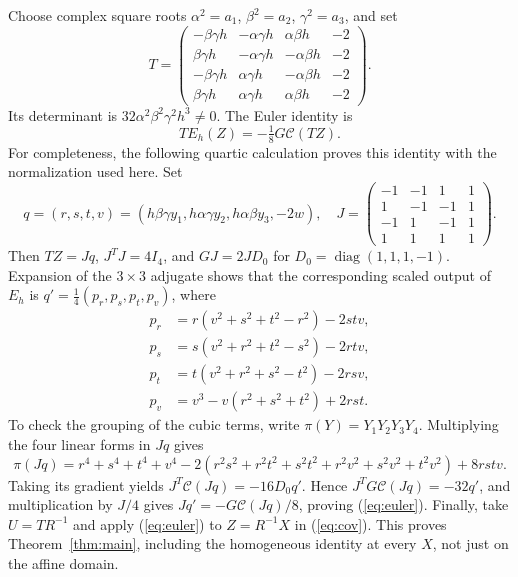 \documentclass[11pt]{article}
\newcommand{\diag}{\operatorname{diag}}
\newcommand{\Cr}{\mathcal C}
\begin{document}
Choose complex square roots $\alpha^2=a_1$, $\beta^2=a_2$, $\gamma^2=a_3$, and set
\begin{equation}\label{eq:T}
 T=\begin{pmatrix}
 -\beta\gamma h&-\alpha\gamma h&\alpha\beta h&-2\\
 \beta\gamma h&-\alpha\gamma h&-\alpha\beta h&-2\\
 -\beta\gamma h&\alpha\gamma h&-\alpha\beta h&-2\\
 \beta\gamma h&\alpha\gamma h&\alpha\beta h&-2
 \end{pmatrix}.
\end{equation}
Its determinant is $32\alpha^2\beta^2\gamma^2h^3\ne0$. The Euler identity is
\begin{equation}\label{eq:euler}
 T E_h(Z)=-\tfrac18 G\Cr(TZ).
\end{equation}
For completeness, the following quartic calculation proves this identity
with the normalization used here. Set
\[
 q=(r,s,t,v)=(h\beta\gamma y_1,h\alpha\gamma y_2,h\alpha\beta y_3,-2w),
 \quad
 J=\begin{pmatrix}-1&-1&1&1\\1&-1&-1&1\\-1&1&-1&1\\1&1&1&1\end{pmatrix}.
\]
Then $TZ=Jq$, $J^TJ=4I_4$, and
$GJ=2J D_0$ for $D_0=\diag(1,1,1,-1)$.
Expansion of the $3\times3$ adjugate shows that the corresponding scaled
output of $E_h$ is $q'=\frac14(p_r,p_s,p_t,p_v)$, where
\begin{align*}
 p_r&=r(v^2+s^2+t^2-r^2)-2stv,\\
 p_s&=s(v^2+r^2+t^2-s^2)-2rtv,\\
 p_t&=t(v^2+r^2+s^2-t^2)-2rsv,\\
 p_v&=v^3-v(r^2+s^2+t^2)+2rst.
\end{align*}
To check the grouping of the cubic terms, write $\pi(Y)=Y_1Y_2Y_3Y_4$.
Multiplying the four linear forms in $Jq$ gives
\[
 \pi(Jq)=r^4+s^4+t^4+v^4
 -2(r^2s^2+r^2t^2+s^2t^2+r^2v^2+s^2v^2+t^2v^2)+8rstv.
\]
Taking its gradient yields
$J^T\Cr(Jq)=-16D_0q'$. Hence
$J^TG\Cr(Jq)=-32q'$, and multiplication by $J/4$ gives
$Jq'=-G\Cr(Jq)/8$, proving (\ref{eq:euler}).
Finally, take $U=TR^{-1}$ and apply (\ref{eq:euler}) to
$Z=R^{-1}X$ in (\ref{eq:cov}). This proves Theorem~\ref{thm:main}, including
the homogeneous identity at every $X$, not just on the affine domain.
\end{document}
